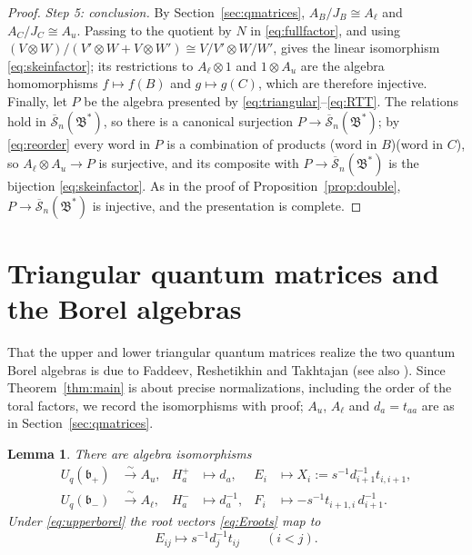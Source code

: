 \documentclass[11pt]{article}
\newtheorem{lemma}[theorem]{Lemma}
\theoremstyle{remark}
\newcommand{\U}{U_q}
\newcommand{\bp}{\mathfrak b_+}
\newcommand{\bm}{\mathfrak b_-}
\newcommand{\redS}{\overline{\mathcal S}_n}
\newcommand{\Bstar}{\mathfrak B^*}
\newcommand{\ot}{\otimes}
\begin{document}
\begin{proof}
\emph{Step 5: conclusion.}
By Section~\ref{sec:qmatrices}, $A_B/J_B\cong A_\ell$ and
$A_C/J_C\cong A_u$. Passing to the quotient by $N$ in
\eqref{eq:fullfactor}, and using
$(V\ot W)/(V'\ot W+V\ot W')\cong V/V'\ot W/W'$, gives the linear
isomorphism \eqref{eq:skeinfactor}; its restrictions to
$A_\ell\ot1$ and $1\ot A_u$ are the algebra homomorphisms
$f\mapsto f(B)$ and $g\mapsto g(C)$, which are therefore injective.
Finally, let $P$ be the algebra presented by
\eqref{eq:triangular}--\eqref{eq:RTT}. The relations hold in
$\redS(\Bstar)$, so there is a canonical surjection $P\to\redS(\Bstar)$;
by \eqref{eq:reorder} every word in $P$ is a combination of products
(word in $B$)(word in $C$), so $A_\ell\ot A_u\to P$ is surjective, and
its composite with $P\to\redS(\Bstar)$ is the bijection
\eqref{eq:skeinfactor}. As in the proof of
Proposition~\ref{prop:double}, $P\to\redS(\Bstar)$ is injective, and
the presentation is complete.
\end{proof}

\section{Triangular quantum matrices and the Borel algebras}\label{sec:borel}

That the upper and lower triangular quantum matrices realize the two
quantum Borel algebras is due to Faddeev, Reshetikhin and Takhtajan
\cite{FRT} (see also \cite[Section 8.5]{KS}). Since
Theorem~\ref{thm:main} is about precise normalizations, including the
order of the toral factors, we record the isomorphisms with proof;
$A_u$, $A_\ell$ and $d_a=t_{aa}$ are as in Section~\ref{sec:qmatrices}.

\begin{lemma}\label{lem:borel}
There are algebra isomorphisms
\begin{align}
 \U(\bp)&\xrightarrow{\ \sim\ }A_u,&
 H^+_a&\longmapsto d_a,&
 E_i&\longmapsto X_i:=s^{-1}d_{i+1}^{-1}t_{i,i+1}, \label{eq:upperborel}\\
 \U(\bm)&\xrightarrow{\ \sim\ }A_\ell,&
 H^-_a&\longmapsto d_a^{-1},&
 F_i&\longmapsto -s^{-1}t_{i+1,i}\,d_{i+1}^{-1}. \label{eq:lowerborel}
\end{align}
Under \eqref{eq:upperborel} the root vectors \eqref{eq:Eroots} map to
\begin{equation}\label{eq:rootimageborel}
 E_{ij}\longmapsto s^{-1}d_j^{-1}t_{ij}\qquad(i<j).
\end{equation}
\end{lemma}
\end{document}
